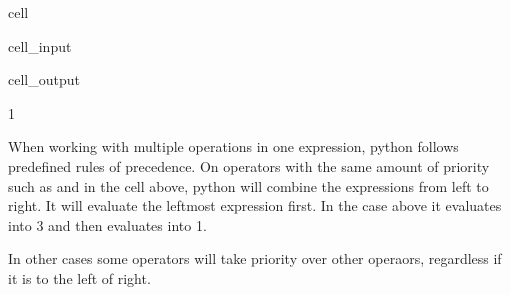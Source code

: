 \documentclass[letterpaper,10pt,english]{jupyterBook}
\begin{document}
\begin{sphinxuseclass}{cell}\begin{sphinxVerbatimInput}

\begin{sphinxuseclass}{cell_input}
\begin{sphinxVerbatim}[commandchars=\\\{\}]
    
\end{sphinxVerbatim}

\end{sphinxuseclass}\end{sphinxVerbatimInput}
\begin{sphinxVerbatimOutput}

\begin{sphinxuseclass}{cell_output}
\begin{sphinxVerbatim}[commandchars=\\\{\}]
\PYGZhy{}1
\end{sphinxVerbatim}

\end{sphinxuseclass}\end{sphinxVerbatimOutput}

\end{sphinxuseclass}
\sphinxAtStartPar
When working with multiple operations in one expression, python follows predefined rules of precedence. On operators with the same amount of priority such as \sphinxcode{\sphinxupquote{+}} and \sphinxcode{\sphinxupquote{\sphinxhyphen{}}} in the cell above, python will combine the expressions from left to right. It will evaluate the leftmost expression first. In the case above it evaluates  into 3 and then evaluates  into \sphinxhyphen{}1.

\sphinxAtStartPar
In other cases some operators will take priority over other operaors, regardless if it is to the left of right.
\end{document}
